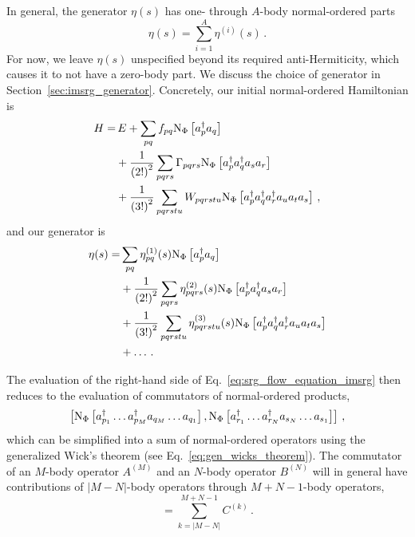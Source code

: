 In general, the generator $\eta(s)$ has one- through $A$-body normal-ordered parts
\begin{equation}
  \eta(s) = \sum_{i=1}^A \eta^{(i)}(s)\,.
\end{equation}
For now, we leave $\eta(s)$ unspecified beyond its required anti-Hermiticity,
which causes it to not have a zero-body part.
We discuss the choice of generator in Section~\ref{sec:imsrg_generator}.
Concretely, our initial normal-ordered Hamiltonian is
\begin{equation}
  \begin{split}
    H = &\,E
  + \sum_{pq} f_{pq} \text{N}_{\Phi}\left[a_{p}^{\dagger} a_{q}\right] \\
    &+ \frac{1}{{(2!)}^2} \sum_{pqrs} \Gamma_{pqrs} \text{N}_{\Phi}\left[a_{p}^{\dagger} a_{q}^{\dagger} a_{s} a_{r}\right]\\
    &+ \frac{1}{{(3!)}^2} \sum_{pqrstu} W_{pqrstu} \text{N}_{\Phi}\left[a_{p}^{\dagger} a_{q}^{\dagger} a_{r}^{\dagger} a_{u} a_{t} a_{s}\right]\,,
  \end{split}
\end{equation}
and our generator is
\begin{equation}
  \begin{split}
    \eta(s) = &
  \sum_{pq} \eta^{(1)}_{pq}(s) \text{N}_{\Phi}\left[a_{p}^{\dagger} a_{q}\right] \\
    &+ \frac{1}{{(2!)}^2} \sum_{pqrs} \eta^{(2)}_{pqrs}(s) \text{N}_{\Phi}\left[a_{p}^{\dagger} a_{q}^{\dagger} a_{s} a_{r}\right]\\
    &+ \frac{1}{{(3!)}^2} \sum_{pqrstu} \eta^{(3)}_{pqrstu}(s) \text{N}_{\Phi}\left[a_{p}^{\dagger} a_{q}^{\dagger} a_{r}^{\dagger} a_{u} a_{t} a_{s}\right]\\
    &+ \ldots \,.
  \end{split}
\end{equation}

The evaluation of the right-hand side of Eq.~\ref{eq:srg_flow_equation_imsrg} then reduces to
the evaluation of commutators of normal-ordered products,
\begin{equation}
  \left[\text{N}_{\Phi}\left[a_{p_1}^{\dagger} \ldots a_{p_M}^{\dagger} a_{q_M} \ldots a_{q_1}\right],
  \text{N}_{\Phi}\left[a_{r_1}^{\dagger} \ldots a_{r_N}^{\dagger} a_{s_N} \ldots a_{s_1}\right]\right]\,,
\end{equation}
which can be simplified into a sum of normal-ordered operators
using the generalized Wick's theorem (see Eq.~\ref{eq:gen_wicks_theorem}).
The commutator of an $M$-body operator $A^{(M)}$ and an $N$-body operator $B^{(N)}$
will in general have contributions of $|M-N|$-body operators through $M+N-1$-body operators,
\begin{equation}
  [A^{(M)}, B^{(N)}] = \sum_{k=|M-N|}^{M+N-1}C^{(k)}\,.
\end{equation}

